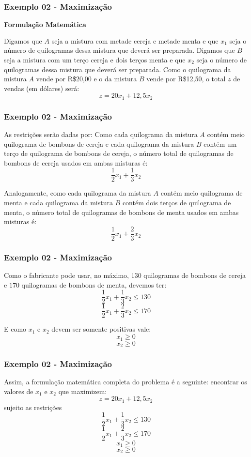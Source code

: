 \documentclass[hyperref={pdfpagelabels=false}]{beamer}
\begin{document}
\begin{frame}
\frametitle{Exemplo 02 - Maximização}

{\bf Formulação Matemática}

Digamos que $A$ seja a mistura com metade cereja e metade menta e que $x_1$ seja o número de quilogramas dessa mistura que deverá ser preparada. Digamos que $B$ seja a mistura com um terço cereja e dois terços menta e que $x_2$ seja o número de quilogramas dessa mistura que deverá ser preparada. Como o quilograma da mistura $A$ vende por R\$20,00 e o da mistura $B$ vende por R\$12,50, o total $z$ de vendas (em dólares) será:
$$z = 20x_1 + 12,5x_2$$

\end{frame}

\begin{frame}
\frametitle{Exemplo 02 - Maximização}

As restrições serão dadas por:
Como cada quilograma da mistura $A$ contém meio quilograma de bombons de cereja e cada quilograma da mistura $B$ contém um terço de quilograma de bombons de cereja, o número total de quilogramas de bombons de cereja usados em ambas misturas é:
$$\frac{1}{2}x_1 + \frac{1}{3}x_2$$

Analogamente, como cada quilograma da mistura $A$ contém meio quilograma de menta e cada quilograma da mistura $B$ contém dois terços de quilograma de menta, o número total de quilogramas de bombons de menta usados em ambas misturas é:
$$\frac{1}{2}x_1 + \frac{2}{3}x_2$$
\end{frame}

\begin{frame}
\frametitle{Exemplo 02 - Maximização}
Como o fabricante pode usar, no máximo, $130$ quilogramas de bombons de cereja e $170$ quilogramas de bombons de menta, devemos ter:
$$\frac{1}{2}x_1 + \frac{1}{3}x_2 \leq 130$$
$$\frac{1}{2}x_1 + \frac{2}{3}x_2 \leq 170$$

E como $x_1$ e $x_2$ devem ser somente positivas vale:
$$x_1 \geq 0$$
$$x_2 \geq 0$$
\end{frame}

\begin{frame}
\frametitle{Exemplo 02 - Maximização}
Assim, a formulação matemática completa do problema é a seguinte: encontrar os valores de $x_1$ e $x_2$ que maximizem:
$$z = 20x_1 + 12,5x_2$$
sujeito as restrições
$$\frac{1}{2}x_1 + \frac{1}{3}x_2 \leq 130$$
$$\frac{1}{2}x_1 + \frac{2}{3}x_2 \leq 170$$
$$x_1 \geq 0$$
$$x_2 \geq 0$$


\end{frame}
\end{document}
